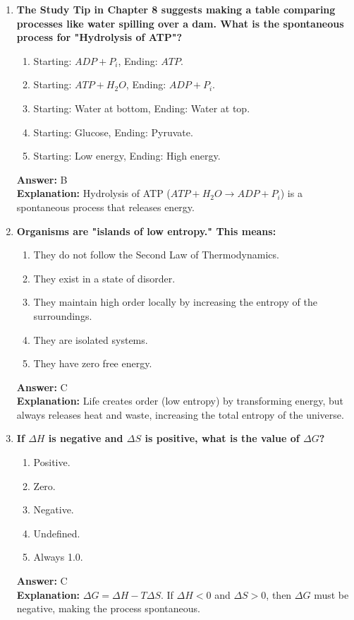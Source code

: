 \documentclass[11pt, a4paper]{article}
\begin{document}
\begin{enumerate}[leftmargin=*, label=\arabic*.]
\item \textbf{The Study Tip in Chapter 8 suggests making a table comparing processes like water spilling over a dam. What is the spontaneous process for "Hydrolysis of ATP"?}
\begin{enumerate}[label=\Alph*.]
    \item Starting: $ADP + P_i$, Ending: $ATP$.
    \item Starting: $ATP + H_2O$, Ending: $ADP + P_i$.
    \item Starting: Water at bottom, Ending: Water at top.
    \item Starting: Glucose, Ending: Pyruvate.
    \item Starting: Low energy, Ending: High energy.
\end{enumerate}
\textbf{Answer:} B \\
\textbf{Explanation:} Hydrolysis of ATP ($ATP + H_2O \rightarrow ADP + P_i$) is a spontaneous process that releases energy.

\item \textbf{Organisms are "islands of low entropy." This means:}
\begin{enumerate}[label=\Alph*.]
    \item They do not follow the Second Law of Thermodynamics.
    \item They exist in a state of disorder.
    \item They maintain high order locally by increasing the entropy of the surroundings.
    \item They are isolated systems.
    \item They have zero free energy.
\end{enumerate}
\textbf{Answer:} C \\
\textbf{Explanation:} Life creates order (low entropy) by transforming energy, but always releases heat and waste, increasing the total entropy of the universe.

\item \textbf{If $\Delta H$ is negative and $\Delta S$ is positive, what is the value of $\Delta G$?}
\begin{enumerate}[label=\Alph*.]
    \item Positive.
    \item Zero.
    \item Negative.
    \item Undefined.
    \item Always 1.0.
\end{enumerate}
\textbf{Answer:} C \\
\textbf{Explanation:} $\Delta G = \Delta H - T\Delta S$. If $\Delta H < 0$ and $\Delta S > 0$, then $\Delta G$ must be negative, making the process spontaneous.


\end{enumerate}
\end{document}
